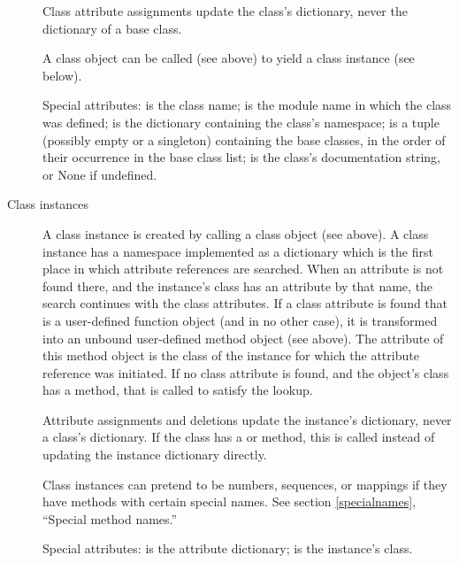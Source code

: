 \begin{description}
Class attribute assignments update the class's dictionary, never the
dictionary of a base class.

A class object can be called (see above) to yield a class instance (see
below).

Special attributes:  is the class name;
 is the module name in which the class was defined;
 is the dictionary containing the class's namespace;
 is a tuple (possibly empty or a singleton)
containing the base classes, in the order of their occurrence in the
base class list;  is the class's documentation string,
or None if undefined.

\item[Class instances]
A class instance is created by calling a class object (see above).
A class instance has a namespace implemented as a dictionary which
is the first place in which
attribute references are searched.  When an attribute is not found
there, and the instance's class has an attribute by that name,
the search continues with the class attributes.  If a class attribute
is found that is a user-defined function object (and in no other
case), it is transformed into an unbound user-defined method object
(see above).  The  attribute of this method object is
the
class of the instance for which the attribute reference was initiated.
If no class attribute is found, and the object's class has a
 method, that is called to satisfy the lookup.

Attribute assignments and deletions update the instance's dictionary,
never a class's dictionary.  If the class has a  or
 method, this is called instead of updating the
instance dictionary directly.

Class instances can pretend to be numbers, sequences, or mappings if
they have methods with certain special names.  See
section \ref{specialnames}, ``Special method names.''

Special attributes:  is the attribute
dictionary;  is the instance's class.


\end{description}

